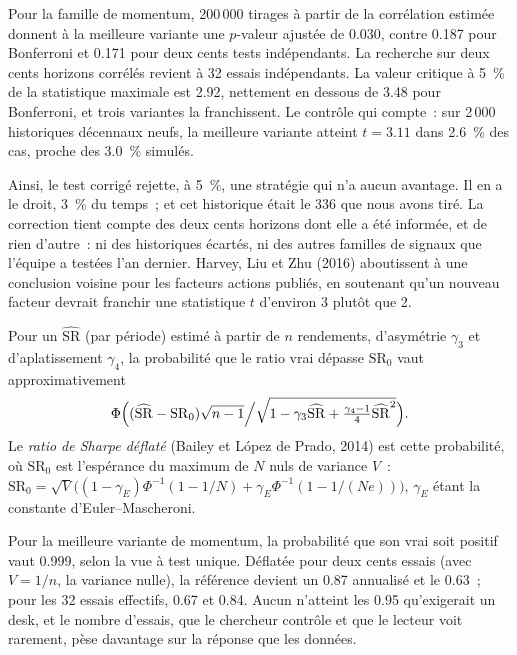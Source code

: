 Pour la famille de momentum, 200\,000 tirages à partir de la corrélation estimée donnent à la meilleure variante une $p$-valeur ajustée de 0.030,
contre 0.187 pour Bonferroni et 0.171 pour deux cents tests indépendants. La recherche sur deux cents horizons corrélés revient
à 32 essais indépendants. La valeur critique à 5~\% de la statistique maximale est 2.92, nettement en dessous de 3.48 pour Bonferroni, et trois variantes
la franchissent. Le contrôle qui compte~: sur 2\,000 historiques décennaux neufs, la meilleure variante atteint $t = 3.11$ dans 2.6~\% des
cas, proche des 3.0~\% simulés.

Ainsi, le test corrigé rejette, à 5~\%, une stratégie qui n'a aucun avantage. Il en a le droit, 3~\% du temps~; et cet historique était le
336 que nous avons tiré. La correction tient compte des deux cents horizons dont elle a été informée, et de rien d'autre~: ni des
historiques écartés, ni des autres familles de signaux que l'équipe a testées l'an dernier. Harvey, Liu et Zhu (2016) aboutissent à une
conclusion voisine pour les facteurs actions publiés, en soutenant qu'un nouveau facteur devrait franchir une statistique $t$ d'environ 3 plutôt que 2.

\begin{definition}\label{def:qm:testing-and-multiple-testing:dsr}
Pour un  $\widehat{\mathrm{SR}}$ (par période) estimé à partir de $n$ rendements, d'asymétrie $\gamma_3$ et d'aplatissement
$\gamma_4$, la probabilité que le ratio vrai dépasse $\mathrm{SR}_0$ vaut approximativement
\[
\Phi\Bigl((\widehat{\mathrm{SR}} - \mathrm{SR}_0)\sqrt{n - 1}\Big/\sqrt{1 - \gamma_3\widehat{\mathrm{SR}} + \tfrac{\gamma_4 - 1}4\widehat{\mathrm{SR}}^2}\Bigr).
\]
Le \emph{ratio de Sharpe déflaté} (Bailey et López de Prado, 2014) est cette probabilité, où $\mathrm{SR}_0$
est l'espérance du maximum de $N$  nuls de variance $V$~: $\mathrm{SR}_0 = \sqrt V\bigl((1 - \gamma_E)\Phi^{-1}(1 - 1/N) +
\gamma_E\Phi^{-1}(1 - 1/(Ne))\bigr)$, $\gamma_E$ étant la constante d'Euler--Mascheroni.
\end{definition}

Pour la meilleure variante de momentum, la probabilité que son  vrai soit positif vaut 0.999, selon la vue à test unique.
Déflatée pour deux cents essais (avec $V = 1/n$, la variance nulle), la référence devient un 0.87 annualisé et le  0.63~;
pour les 32 essais effectifs, 0.67 et 0.84. Aucun n'atteint les 0.95 qu'exigerait un desk, et le nombre d'essais, que le chercheur
contrôle et que le lecteur voit rarement, pèse davantage sur la réponse que les données.


